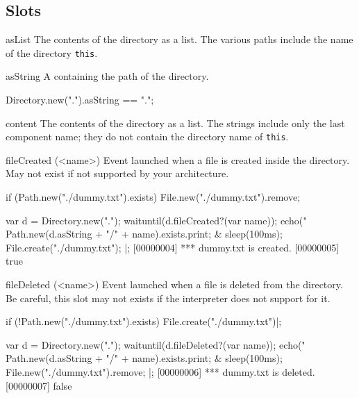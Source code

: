 \subsection{Slots}
\begin{urbiscriptapi}
\item[asList]
  The contents of the directory as a  list.  The
  various paths include the name of the directory \lstinline|this|.

\item[asString] A  containing the path of the directory.

\begin{urbiassert}
Directory.new(".").asString == ".";
\end{urbiassert}


\item[content]
  The contents of the directory as a  list.  The
  strings include only the last component name; they do not contain
  the directory name of \lstinline|this|.

\item[fileCreated](<name>)%
  Event launched when a file is created inside the directory.
  May not exist if not supported by your architecture.

\begin{urbiscript}[firstnumber=1]
if (Path.new("./dummy.txt").exists)
  File.new("./dummy.txt").remove;

  {
    var d = Directory.new(".");
    waituntil(d.fileCreated?(var name));
    echo("%
    Path.new(d.asString + "/" + name).exists.print;
  }
&
  {
    sleep(100ms);
    File.create("./dummy.txt");
  }|;
[00000004] *** dummy.txt is created.
[00000005] true
\end{urbiscript}

\item[fileDeleted](<name>)%
  Event launched when a file is deleted from the directory.  Be careful,
  this slot may not exists if the \us interpreter does not support for it.

\begin{urbiscript}
if (!Path.new("./dummy.txt").exists)
  File.create("./dummy.txt")|;

  {
    var d = Directory.new(".");
    waituntil(d.fileDeleted?(var name));
    echo("%
    Path.new(d.asString + "/" + name).exists.print;
  }
&
  {
    sleep(100ms);
    File.new("./dummy.txt").remove;
  }|;
[00000006] *** dummy.txt is deleted.
[00000007] false
\end{urbiscript}


\end{urbiscriptapi}


